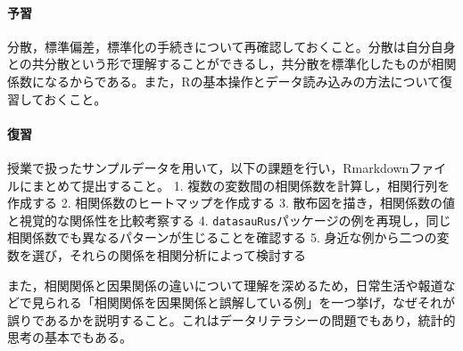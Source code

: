 \paragraph{予習}
分散，標準偏差，標準化の手続きについて再確認しておくこと。分散は自分自身との共分散という形で理解することができるし，共分散を標準化したものが相関係数になるからである。また，Rの基本操作とデータ読み込みの方法について復習しておくこと。
\paragraph{復習}
授業で扱ったサンプルデータを用いて，以下の課題を行い，Rmarkdownファイルにまとめて提出すること。
1. 複数の変数間の相関係数を計算し，相関行列を作成する
2. 相関係数のヒートマップを作成する
3. 散布図を描き，相関係数の値と視覚的な関係性を比較考察する
4. \texttt{datasauRus}パッケージの例を再現し，同じ相関係数でも異なるパターンが生じることを確認する
5. 身近な例から二つの変数を選び，それらの関係を相関分析によって検討する

また，相関関係と因果関係の違いについて理解を深めるため，日常生活や報道などで見られる「相関関係を因果関係と誤解している例」を一つ挙げ，なぜそれが誤りであるかを説明すること。これはデータリテラシーの問題でもあり，統計的思考の基本でもある。